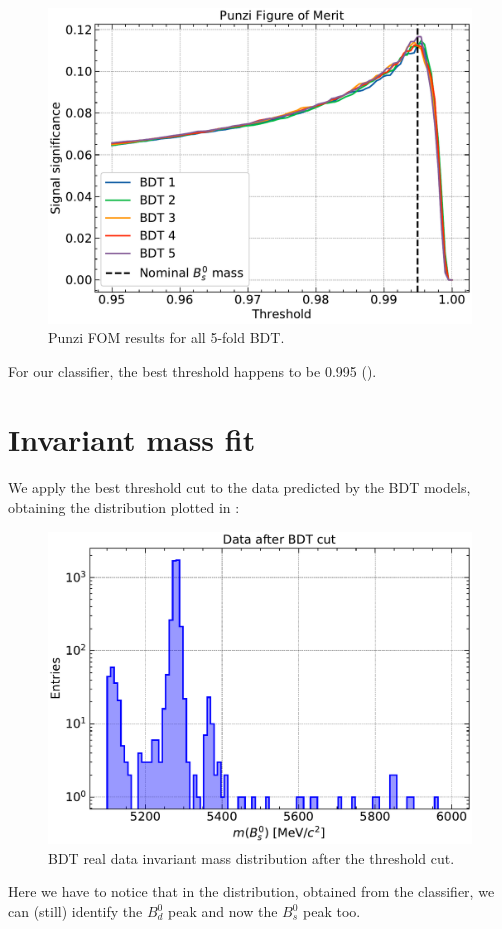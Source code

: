 \begin{figure}[H]
    \centering
    \includegraphics[width=0.6\linewidth]{graphs/punzi.pdf}
    \caption{Punzi FOM results for all 5-fold BDT.}
    \label{punzi}
\end{figure}

For our classifier, the best threshold happens to be 0.995 ().


\section{Invariant mass fit}
We apply the best threshold cut to the data predicted by the BDT models, obtaining the distribution plotted in :

\begin{figure}[H]
    \centering
    \includegraphics[width=0.70\linewidth]{graphs/dataBDTcut.pdf}
    \caption{BDT real data invariant mass distribution after the threshold cut.}
    \label{BDT}
\end{figure}

Here we have to notice that in the distribution, obtained from the classifier, we can (still) identify the $B_d^0$ peak and now the $B_s^0$ peak too.

